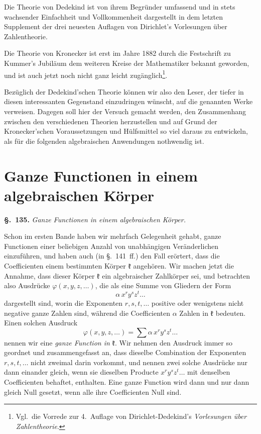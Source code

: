 \documentclass[12pt,a4paper]{article}
\theoremstyle{definition}
\begin{document}
Die Theorie von Dedekind ist von ihrem Begründer umfassend und in stets wachsender Einfachheit und Vollkommenheit dargestellt in dem letzten Supplement der drei neuesten Auflagen von Dirichlet's Vorlesungen über Zahlentheorie.

Die Theorie von Kronecker ist erst im Jahre 1882 durch die Festschrift zu Kummer's Jubiläum dem weiteren Kreise der Mathematiker bekannt geworden, und ist auch jetzt noch nicht ganz leicht zugänglich\footnote{Vgl.\ die Vorrede zur 4.\ Auflage von Dirichlet-Dedekind's \textit{Vorlesungen über Zahlentheorie}.}.

Bezüglich der Dedekind'schen Theorie können wir also den Leser, der tiefer in diesen interessanten Gegenstand einzudringen wünscht, auf die genannten Werke verweisen. Dagegen soll hier der Versuch gemacht werden, den Zusammenhang zwischen den verschiedenen Theorien herzustellen und auf Grund der Kronecker'schen Voraussetzungen und Hülfsmittel so viel daraus zu entwickeln, als für die folgenden algebraischen Anwendungen nothwendig ist.

\newpage
\section{Ganze Functionen in einem algebraischen Körper}\label{sec:135}

\noindent\textbf{\S.~135.}\quad
\textit{Ganze Functionen in einem algebraischen Körper.}\par\medskip

Schon im ersten Bande haben wir mehrfach Gelegenheit gehabt, ganze Functionen einer beliebigen Anzahl von unabhängigen Veränderlichen einzuführen, und haben auch (in \S.~141~ff.) den Fall erörtert, dass die Coefficienten einem bestimmten Körper $\mathfrak{k}$ angehören. Wir machen jetzt die Annahme, dass dieser Körper $\mathfrak{k}$ ein algebraischer Zahlkörper sei, und betrachten also Ausdrücke $\varphi(x,y,z,\dots)$, die als eine Summe von Gliedern der Form
\[
\alpha\,x^r y^s z^t \dots
\]
dargestellt sind, worin die Exponenten $r,s,t,\dots$ positive oder wenigstens nicht negative ganze Zahlen sind, während die Coefficienten $\alpha$ Zahlen in $\mathfrak{k}$ bedeuten. Einen solchen Ausdruck
\begin{equation}\label{eq:135-1}
\varphi(x,y,z,\dots) = \sum \alpha\,x^r y^s z^t \dots
\end{equation}
nennen wir eine \emph{ganze Function in} $\mathfrak{k}$. Wir nehmen den Ausdruck immer so geordnet und zusammengefasst an, dass dieselbe Combination der Exponenten $r,s,t,\dots$ nicht zweimal darin vorkommt, und nennen zwei solche Ausdrücke nur dann einander gleich, wenn sie dieselben Producte $x^r y^s z^t \dots$ mit denselben Coefficienten behaftet, enthalten. Eine ganze Function wird dann und nur dann gleich Null gesetzt, wenn alle ihre Coefficienten Null sind.
\end{document}
